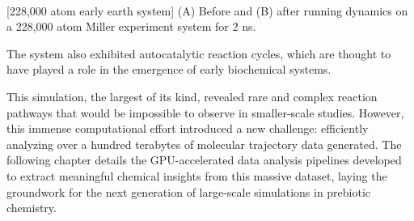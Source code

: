 
\begin{flushleft}
\begin{multiFigure}
     \\
[228,000 atom early earth system]{
(A) Before and (B) after running dynamics on a 228,000 atom Miller experiment system for 2 ns.
}
\label{fig:228000_atom_run}
\end{multiFigure}
\end{flushleft}

The system also exhibited autocatalytic reaction cycles, which are thought to have played a role in the emergence of early biochemical systems.

This simulation, the largest of its kind, revealed rare and complex reaction pathways that would be impossible to observe in smaller-scale studies. However, this immense computational effort introduced a new challenge: efficiently analyzing over a hundred terabytes of molecular trajectory data generated. The following chapter details the GPU-accelerated data analysis pipelines developed to extract meaningful chemical insights from this massive dataset, laying the groundwork for the next generation of large-scale simulations in prebiotic chemistry.